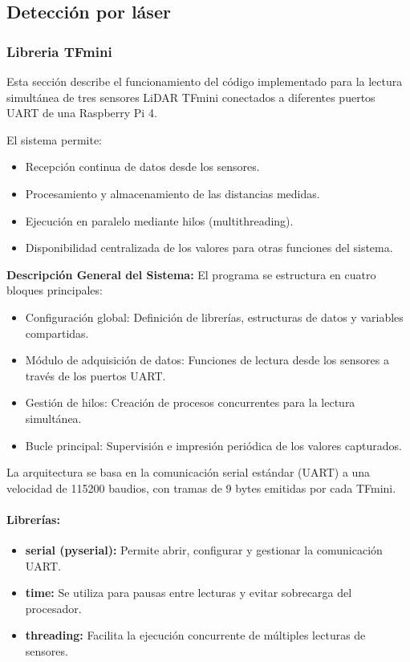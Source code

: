 \documentclass[12pt,a4paper]{article}
\begin{document}
\subsection{Detección por láser}
\subsubsection{Libreria TFmini}
Esta sección describe el funcionamiento del código implementado para la lectura simultánea de tres sensores LiDAR TFmini conectados a diferentes puertos UART de una Raspberry Pi 4.

El sistema permite:
\begin{itemize}
\item Recepción continua de datos desde los sensores.
\item Procesamiento y almacenamiento de las distancias medidas.
\item Ejecución en paralelo mediante hilos (multithreading).
\item Disponibilidad centralizada de los valores para otras funciones del sistema.
\end{itemize}

\textbf{Descripción General del Sistema:}
El programa se estructura en cuatro bloques principales:
\begin{itemize}
\item Configuración global: Definición de librerías, estructuras de datos y variables compartidas.
\item Módulo de adquisición de datos: Funciones de lectura desde los sensores a través de los puertos UART.
\item Gestión de hilos: Creación de procesos concurrentes para la lectura simultánea.
\item Bucle principal: Supervisión e impresión periódica de los valores capturados.
\end{itemize}
La arquitectura se basa en la comunicación serial estándar (UART) a una velocidad de 115200 baudios, con tramas de 9 bytes emitidas por cada TFmini.

\paragraph{Librerías:}
\begin{itemize}
\item \textbf{serial (pyserial):} Permite abrir, configurar y gestionar la comunicación UART.
\item \textbf{time:} Se utiliza para pausas entre lecturas y evitar sobrecarga del procesador.
\item \textbf{threading:} Facilita la ejecución concurrente de múltiples lecturas de sensores.
\end{itemize}
\end{document}
